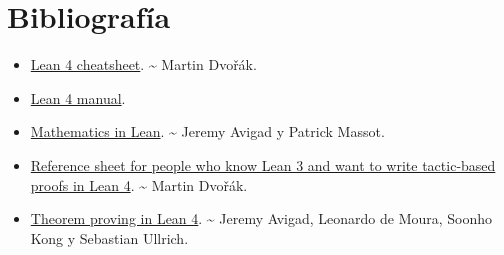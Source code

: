 \chapter{Bibliografía}
\label{sec:orgb0619aa}

\begin{itemize}
\item \href{https://raw.githubusercontent.com/madvorak/lean4-cheatsheet/main/lean-tactics.pdf}{Lean 4 cheatsheet}. \textasciitilde{} Martin Dvořák.
\item \href{https://leanprover.github.io/lean4/doc/whatIsLean.html}{Lean 4 manual}.
\item \href{https://leanprover-community.github.io/mathematics\_in\_lean/mathematics\_in\_lean.pdf}{Mathematics in Lean}. \textasciitilde{} Jeremy Avigad y Patrick Massot.
\item \href{https://github.com/madvorak/lean3-tactic-lean4/blob/main/README.md}{Reference sheet for people who know Lean 3 and want to write tactic-based proofs in Lean 4}. \textasciitilde{} Martin Dvořák.
\item \href{https://leanprover.github.io/theorem\_proving\_in\_lean4/title\_page.html}{Theorem proving in Lean 4}. \textasciitilde{} Jeremy Avigad, Leonardo de Moura, Soonho
Kong y Sebastian Ullrich.
\end{itemize}


